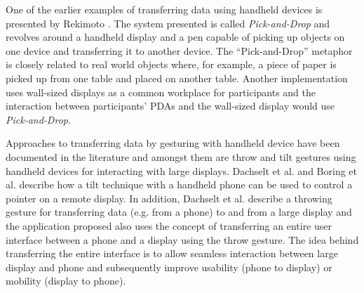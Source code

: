 One of the earlier examples of transferring data using handheld devices is presented by Rekimoto \cite{Rekimoto:1997}. 
The system presented is called \textit{Pick-and-Drop} and revolves around a handheld display and a pen capable of picking up objects on one device and transferring it to another device.
The ``Pick-and-Drop'' metaphor is closely related to real world objects where, for example, a piece of paper is picked up from one table and placed on another table.
Another implementation uses wall-sized displays as a common workplace for participants and the interaction between participants' PDAs and the wall-sized display would use \textit{Pick-and-Drop}.

Approaches to transferring data by gesturing with handheld device have been documented in the literature and amongst them are throw and tilt gestures using handheld devices for interacting with large displays.
Dachselt et al. \cite{Dachselt:2008} and Boring et al. \cite{Boring:2009} describe how a tilt technique with a handheld phone can be used to control a pointer on a remote display.
In addition, Dachselt et al. describe a throwing gesture for transferring data (e.g. from a phone) to and from a large display and the application proposed also uses the concept of transferring an entire user interface between a phone and a display using the throw gesture.
The idea behind transferring the entire interface is to allow seamless interaction between large display and phone and subsequently improve usability (phone to display) or mobility (display to phone).